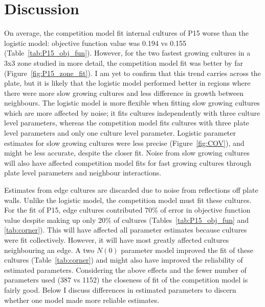 \graphicspath{{images/}}

\section{Discussion}
\label{sec:discussion}


On average, the competition model fit internal cultures of P15 worse
than the logistic model: objective function value was 0.194 vs 0.155
(Table~\ref{tab:P15_obj_fun}). However, for the two fastest growing
cultures in a 3x3 zone studied in more detail, the competition model
fit was better by far (Figure~\ref{fig:P15_zone_fit}). I am yet to
confirm that this trend carries across the plate, but it is likely
that the logistic model performed better in regions where there were
more slow growing cultures and less difference in growth between
neighbours. The logistic model is more flexible when fitting slow
growing cultures which are more affected by noise; it fits cultures
independently with three culture level parameters, whereas the
competition model fits cultures with three plate level parameters and
only one culture level parameter. Logistic parameter estimates for
slow growing cultures were less precise (Figure~\ref{fig:COV}), and
might be less accurate, despite the closer fit. Noise from slow
growing cultures will also have affected competition model fits for
fast growing cultures through plate level parameters and neighbour
interactions.

Estimates from edge cultures are discarded due to noise from
reflections off plate walls. Unlike the logistic model, the
competition model must fit these cultures. For the fit of P15, edge
cultures contributed 70\% of error in objective function value despite
making up only 20\% of cultures (Tables~\ref{tab:P15_obj_fun} and
\ref{tab:corner}). This will have affected all parameter estimates
because cultures were fit collectively. However, it will have most
greatly affected cultures neighbouring an edge. A two \(N(0)\)
parameter model improved the fit of these cultures
(Table~\ref{tab:corner}) and might also have improved the reliability
of estimated parameters.
Considering the above effects and the fewer number of parameters used
(387 vs 1152) the closeness of fit of the competition model is fairly
good. Below I discuss differences in estimated parameters to discern
whether one model made more reliable estimates.

